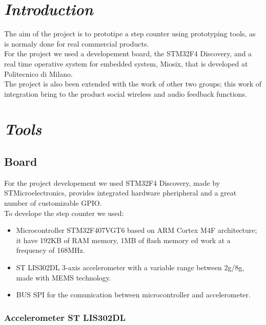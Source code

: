 \documentclass[a4paper,12pt,oneside]{report}
\begin{document}


\chapter{\textit{Introduction}}

The aim of the project is to prototipe a step counter using prototyping tools, 
as is normaly done for real commercial products.\\
For the project we used a developement board, the STM32F4 Discovery, 
and a real time operative system for embedded system, Miosix, that is developed
at Politecnico di Milano.\\
The project is also been extended with the work of other two groups; this work
of integration bring to the product social wireless and audio feedback functions.

\newpage{}


\chapter{\textit{Tools}}


\section{Board}

For the project developement we used STM32F4 Discovery, made by STMicroelectronics, 
provides integrated hardware pheripheral and a great number of customizable GPIO.\\
To develope the step counter we used:
\begin{itemize}
\item Microcontroller STM32F407VGT6 based on ARM Cortex
M4F architecture; it have 192KB of RAM memory, 1MB of flash memory ed work
at a frequency of 168MHz.
\item ST LIS302DL 3-axis accelerometer with a variable range between \textpm{}2g/\textpm{}8g,
made with MEMS technology.
\item BUS SPI for the comunication between microcontroller and accelerometer.
\end{itemize}


\subsection{Accelerometer ST LIS302DL}
\end{document}
